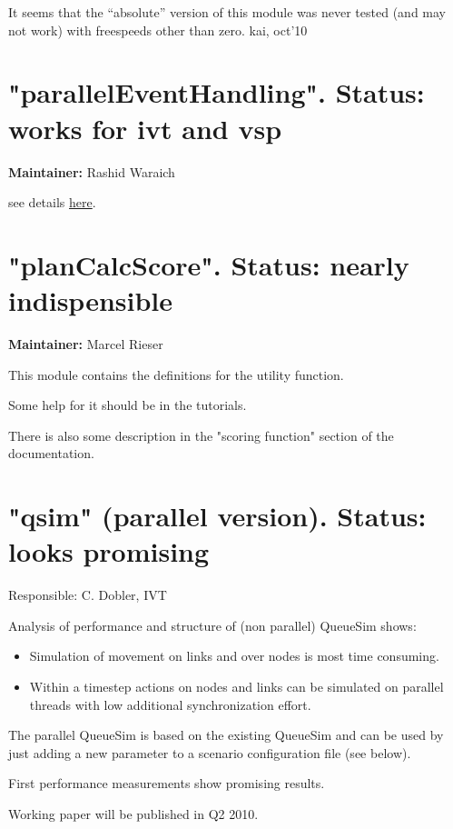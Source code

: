 It  seems that the ``absolute'' version of this module was never tested (and  may not work) with freespeeds other than zero. kai, oct'10



\vfill\eject
\section{"parallelEventHandling". Status: works for ivt and vsp}

\textbf{Maintainer:} Rashid Waraich

see details \href{http://matsim.org/node/238}{here}.



\vfill\eject
\section{"planCalcScore". Status: nearly indispensible}

\textbf{Maintainer:} Marcel Rieser

This module contains the definitions for the utility function.

Some help for it should be in the tutorials.

There is also some description in the "scoring function" section of the documentation.

\vfill\eject
\section{"qsim" (parallel version). Status: looks promising}

Responsible: C. Dobler, IVT

Analysis of performance and structure of (non parallel) QueueSim shows:
\begin{itemize}
	\item Simulation of movement on links and over nodes is most time consuming.
	\item Within a timestep actions on nodes and links can be simulated on parallel threads with low additional synchronization effort.
\end{itemize}

The  parallel QueueSim is based on the existing QueueSim and can be used by  just adding a new parameter to a scenario configuration file (see  below).

First performance measurements show promising results.

Working paper will be published in Q2 2010.

